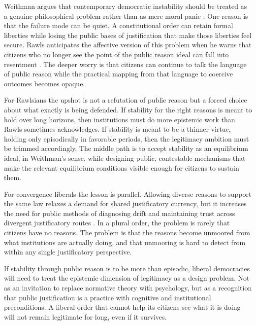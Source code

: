 \documentclass[12pt]{article}
\begin{document}
Weithman argues that contemporary democratic instability should be treated as a genuine philosophical problem rather than as mere moral panic \parencite[p.~1187]{Weithman2024Rescuing}. One reason is that the failure mode can be quiet. A constitutional order can retain formal liberties while losing the public bases of justification that make those liberties feel secure. Rawls anticipates the affective version of this problem when he warns that citizens who no longer see the point of the public reason ideal can fall into resentment \parencite[p.~485]{rawls2005political}. The deeper worry is that citizens can continue to talk the language of public reason while the practical mapping from that language to coercive outcomes becomes opaque.

For Rawlsians the upshot is not a refutation of public reason but a forced choice about what exactly is being defended. If stability for the right reasons is meant to hold over long horizons, then institutions must do more epistemic work than Rawls sometimes acknowledges. If stability is meant to be a thinner virtue, holding only episodically in favorable periods, then the legitimacy ambition must be trimmed accordingly. The middle path is to accept stability as an equilibrium ideal, in Weithman's sense, while designing public, contestable mechanisms that make the relevant equilibrium conditions visible enough for citizens to sustain them.

For convergence liberals the lesson is parallel. Allowing diverse reasons to support the same law relaxes a demand for shared justificatory currency, but it increases the need for public methods of diagnosing drift and maintaining trust across divergent justificatory routes \parencite[p.~297]{gaus2011order}. In a plural order, the problem is rarely that citizens have no reasons. The problem is that the reasons become unmoored from what institutions are actually doing, and that unmooring is hard to detect from within any single justificatory perspective.

If stability through public reason is to be more than episodic, liberal democracies will need to treat the epistemic dimension of legitimacy as a design problem. Not as an invitation to replace normative theory with psychology, but as a recognition that public justification is a practice with cognitive and institutional preconditions. A liberal order that cannot help its citizens see what it is doing will not remain legitimate for long, even if it survives.

\printbibliography
\end{document}
